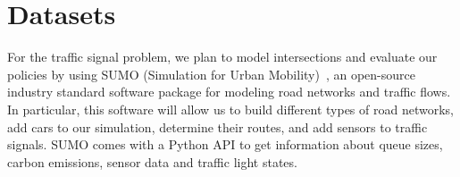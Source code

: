 
\section{Datasets}
\label{sec:data}

For the traffic signal problem, we plan to model intersections and evaluate our policies by using SUMO (Simulation for Urban Mobility)~\cite{sumo}, an open-source industry standard software package for modeling road networks and traffic flows. In particular, this software will allow us to build different types of road networks, add cars to our simulation, determine their routes, and add sensors to traffic signals. SUMO comes with a Python API to get information about queue sizes, carbon emissions, sensor data and traffic light states. 


